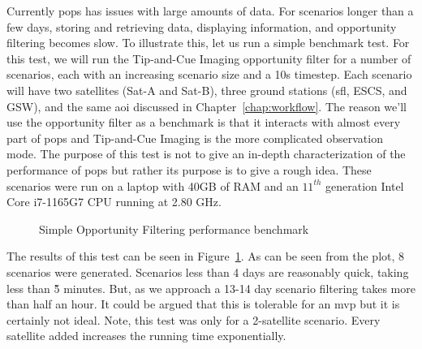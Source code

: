 Currently \gls{pops} has issues with large amounts of data. For scenarios
longer than a few days, storing and retrieving data, displaying information,
and opportunity filtering becomes slow. To illustrate this, let us run a simple
benchmark test. For this test, we will run the Tip-and-Cue Imaging opportunity
filter for a number of scenarios, each with an increasing scenario size and a
10s timestep. Each scenario will have two satellites (Sat-A and Sat-B), three
ground stations (\acrshort{sfl}, ESCS, and GSW), and the same \gls{aoi}
discussed in Chapter~\ref{chap:workflow}. The reason we'll use the opportunity
filter as a benchmark is that it interacts with almost every part of \gls{pops}
and Tip-and-Cue Imaging is the more complicated observation mode.
The purpose of this test is not to give an in-depth characterization of the
performance of \gls{pops} but rather its purpose is to give a rough idea.
These scenarios were run on a laptop with 40GB of RAM and an $11^{th}$
generation Intel Core i7-1165G7 CPU running at 2.80 GHz. 


\begin{figure}[h]
    \centering
    \caption{Simple Opportunity Filtering performance benchmark}
    \label{fig:performance-benchmark}
\end{figure}

The results of this test can be seen in Figure~\ref{fig:performance-benchmark}.
As can be seen from the plot, 8 scenarios were generated. Scenarios less than 4
days are reasonably quick, taking less than \~5 minutes. But, as we approach a
13-14 day scenario filtering takes more than half an hour. It could be argued
that this is tolerable for an \gls{mvp} but it is certainly not ideal.  Note,
this test was only for a 2-satellite scenario. Every satellite added increases
the running time exponentially. 

